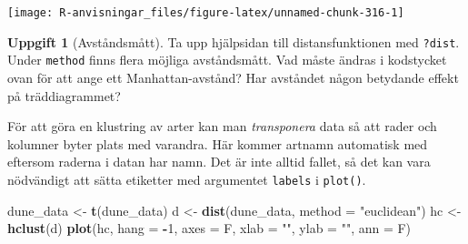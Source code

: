 \documentclass[
]{book}
\newenvironment{Shaded}{\begin{snugshade}}{\end{snugshade}}
\newcommand{\AttributeTok}[1]{\textcolor[rgb]{0.13,0.29,0.53}{#1}}
\newcommand{\DecValTok}[1]{\textcolor[rgb]{0.00,0.00,0.81}{#1}}
\newcommand{\FunctionTok}[1]{\textcolor[rgb]{0.13,0.29,0.53}{\textbf{#1}}}
\newcommand{\NormalTok}[1]{#1}
\newcommand{\OtherTok}[1]{\textcolor[rgb]{0.56,0.35,0.01}{#1}}
\newcommand{\SpecialCharTok}[1]{\textcolor[rgb]{0.81,0.36,0.00}{\textbf{#1}}}
\newcommand{\StringTok}[1]{\textcolor[rgb]{0.31,0.60,0.02}{#1}}
\theoremstyle{definition}
\theoremstyle{definition}
\theoremstyle{definition}
\newtheorem{exercise}{Uppgift}[chapter]
\theoremstyle{definition}
\theoremstyle{remark}
\begin{document}
\begin{Shaded}
\end{Shaded}

\begin{center}\texttt{[image: R-anvisningar\_files/figure-latex/unnamed-chunk-316-1]} \end{center}

\begin{exercise}[Avståndsmått]
Ta upp hjälpsidan till distansfunktionen med \texttt{?dist}. Under \texttt{method} finns flera möjliga avståndsmått. Vad måste ändras i kodstycket ovan för att ange ett Manhattan-avstånd? Har avståndet någon betydande effekt på träddiagrammet?
\end{exercise}

För att göra en klustring av arter kan man \emph{transponera} data så att rader och kolumner byter plats med varandra. Här kommer artnamn automatisk med eftersom raderna i datan har namn. Det är inte alltid fallet, så det kan vara nödvändigt att sätta etiketter med argumentet \texttt{labels} i \texttt{plot()}.

\begin{Shaded}
\begin{Highlighting}[]
\NormalTok{dune\_data }\OtherTok{\textless{}{-}} \FunctionTok{t}\NormalTok{(dune\_data)}
\NormalTok{d }\OtherTok{\textless{}{-}} \FunctionTok{dist}\NormalTok{(dune\_data, }\AttributeTok{method =} \StringTok{"euclidean"}\NormalTok{)}
\NormalTok{hc }\OtherTok{\textless{}{-}} \FunctionTok{hclust}\NormalTok{(d)}
\FunctionTok{plot}\NormalTok{(hc, }\AttributeTok{hang =} \SpecialCharTok{{-}}\DecValTok{1}\NormalTok{,}
     \AttributeTok{axes =}\NormalTok{ F, }\AttributeTok{xlab =} \StringTok{""}\NormalTok{, }\AttributeTok{ylab =} \StringTok{""}\NormalTok{, }\AttributeTok{ann =}\NormalTok{ F)}
\end{Highlighting}
\end{Shaded}
\end{document}
